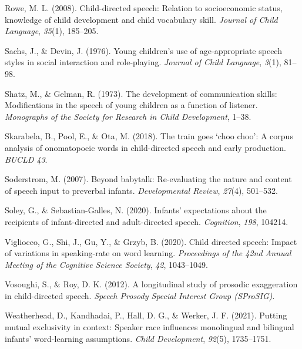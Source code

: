 \documentclass[10pt, letterpaper]{article}
\newenvironment{CSLReferences}%
  {}%
  {\par}
\begin{document}
\begin{CSLReferences}
\leavevmode\hypertarget{ref-rowe2008child}{}%
Rowe, M. L. (2008). Child-directed speech: Relation to socioeconomic
status, knowledge of child development and child vocabulary skill.
\emph{Journal of Child Language}, \emph{35}(1), 185--205.

\leavevmode\hypertarget{ref-sachs1976young}{}%
Sachs, J., \& Devin, J. (1976). Young children's use of age-appropriate
speech styles in social interaction and role-playing. \emph{Journal of
Child Language}, \emph{3}(1), 81--98.

\leavevmode\hypertarget{ref-shatz1973development}{}%
Shatz, M., \& Gelman, R. (1973). The development of communication
skills: Modifications in the speech of young children as a function of
listener. \emph{Monographs of the Society for Research in Child
Development}, 1--38.

\leavevmode\hypertarget{ref-skarabela2018train}{}%
Skarabela, B., Pool, E., \& Ota, M. (2018). The train goes {`choo
choo'}: A corpus analysis of onomatopoeic words in child-directed speech
and early production. \emph{BUCLD 43}.

\leavevmode\hypertarget{ref-soderstrom2007beyond}{}%
Soderstrom, M. (2007). Beyond babytalk: Re-evaluating the nature and
content of speech input to preverbal infants. \emph{Developmental
Review}, \emph{27}(4), 501--532.

\leavevmode\hypertarget{ref-soley2020infants}{}%
Soley, G., \& Sebastian-Galles, N. (2020). Infants' expectations about
the recipients of infant-directed and adult-directed speech.
\emph{Cognition}, \emph{198}, 104214.

\leavevmode\hypertarget{ref-vigliocco2020child}{}%
Vigliocco, G., Shi, J., Gu, Y., \& Grzyb, B. (2020). Child directed
speech: Impact of variations in speaking-rate on word learning.
\emph{Proceedings of the 42nd Annual Meeting of the Cognitive Science
Society}, \emph{42}, 1043--1049.

\leavevmode\hypertarget{ref-vosoughi2012longitudinal}{}%
Vosoughi, S., \& Roy, D. K. (2012). A longitudinal study of prosodic
exaggeration in child-directed speech. \emph{Speech Prosody Special
Interest Group (SProSIG)}.

\leavevmode\hypertarget{ref-weatherhead2021putting}{}%
Weatherhead, D., Kandhadai, P., Hall, D. G., \& Werker, J. F. (2021).
Putting mutual exclusivity in context: Speaker race influences
monolingual and bilingual infants' word-learning assumptions.
\emph{Child Development}, \emph{92}(5), 1735--1751.

\end{CSLReferences}


\end{document}
